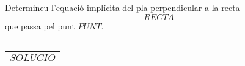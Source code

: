 \begin{enunciat}
Determineu l'equació implícita del pla perpendicular a la recta 
\[
  RECTA
\]
que passa pel punt $PUNT$.
\end{enunciat}

\begin{quadricula}
\begin{tabular}{|C{5cm}{0.5cm}|}
\hline
  \\
\hline
\end{tabular}
\end{quadricula}

\begin{solucio}
\begin{center}
\begin{tabular}{|C{5cm}{0.5cm}|}
\hline
$SOLUCIO$ \\
\hline
\end{tabular}
\end{center}
\end{solucio}
